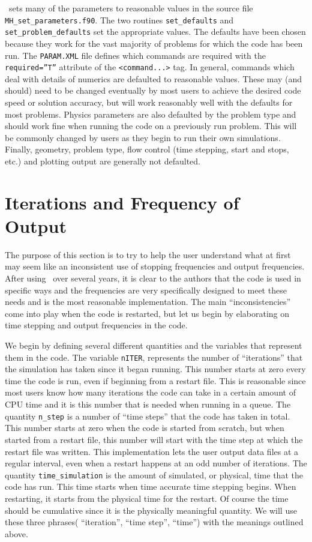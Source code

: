 \BATSRUS\ sets many of the parameters to reasonable values in the source file 
{\tt MH\_set\_parameters.f90}.  The two routines
{\tt set\_defaults} and {\tt set\_problem\_defaults} set 
the appropriate values.
The defaults have been chosen because they work for the vast
majority of problems for which the code has been run.  
The {\tt PARAM.XML} file defines which commands are required
with the {\tt required=''T''} attribute of the {\tt <command...>} tag.
In general, commands which deal with details of numerics are defaulted to 
reasonable values.
These may (and should) need to be changed eventually by most users 
to achieve the desired code speed or solution accuracy, but will
work reasonably well with the defaults for most problems.
Physics parameters are also defaulted by the problem type and should work fine
when running the code on a previously run problem.  
This will be commonly changed by users as they begin to run their 
own simulations. Finally, geometry, problem type,
flow control (time stepping, start and stops, etc.) and plotting output 
are generally not defaulted.

\section{Iterations and Frequency of Output \label{section:frequency}}

The purpose of this section is to try to help the user understand what at
first may seem like an inconsistent use of stopping frequencies and output
frequencies.  After using \BATSRUS\ over several years, it is clear to the
authors that the code is used in specific ways and the frequencies are
very specifically designed to meet these needs and is the 
most reasonable implementation. The main ``inconsistencies''
come into play when the code is restarted, but let us begin by 
elaborating on time stepping and output frequencies in the code.

We begin by defining several different quantities and the variables that 
represent them in the code.  The variable {\tt nITER}, represents the number
of ``iterations'' that the simulation has taken since it began running.  
This number starts at zero every time the code is run, even if beginning 
from a restart file.
This is reasonable since most users know how many iterations the code can take
in a certain amount of CPU time and it is this number that is needed when 
running in a queue.
The quantity {\tt n\_step} is a number of ``time steps'' that the code has 
taken in total.  This number starts at zero when the code is started from 
scratch, but when started from a restart file, this
number will start with the time step at which the restart file was written.
This implementation lets the user output data files at a regular interval, even
when a restart happens at an odd number of iterations.
The quantity {\tt time\_simulation} is the amount of simulated, or physical, 
time that the code has run.  
This time starts when time accurate time stepping begins.
When restarting, it starts from the physical time for the restart.
Of course the time should be cumulative since it is the physically meaningful
quantity.  We will 
use these three phrases( ``iteration'', ``time step'', ``time'') 
with the meanings outlined above.

